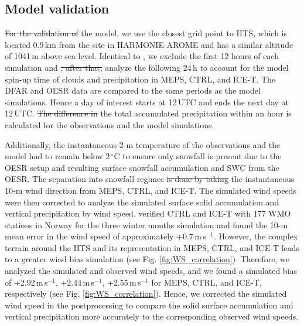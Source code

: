 \documentclass{ametsocV5}
\providecommand{\DIFadd}[1]{{\protect\color{blue}\uwave{#1}}} %
\providecommand{\DIFdel}[1]{{\protect\color{red}\sout{#1}}}                      %
\providecommand{\DIFaddbegin}{} %
\providecommand{\DIFaddend}{} %
\providecommand{\DIFdelbegin}{} %
\providecommand{\DIFdelend}{} %
\newcommand{\DIFscaledelfig}{0.5}
\newlength{\DIFdelgraphicswidth} %
\newlength{\DIFdelgraphicsheight} %
\newcommand{\DIFaddincludegraphics}[2][]{{\color{blue}\fbox{\DIFOincludegraphics[#1]{#2}}}} %
\newcommand{\DIFdelincludegraphics}[2][]{%
\sbox{\DIFdelgraphicsbox}{\DIFOincludegraphics[#1]{#2}}%
\settoboxwidth{\DIFdelgraphicswidth}{\DIFdelgraphicsbox} %
\settoboxtotalheight{\DIFdelgraphicsheight}{\DIFdelgraphicsbox} %
\scalebox{\DIFscaledelfig}{%
\parbox[b]{\DIFdelgraphicswidth}{\usebox{\DIFdelgraphicsbox}\\[-\baselineskip] \rule{\DIFdelgraphicswidth}{0em}}\llap{\resizebox{\DIFdelgraphicswidth}{\DIFdelgraphicsheight}{%
\setlength{\unitlength}{\DIFdelgraphicswidth}%
\begin{picture}(1,1)%
\thicklines\linethickness{2pt} %
{\color[rgb]{1,0,0}\put(0,0){\framebox(1,1){}}}%
{\color[rgb]{1,0,0}\put(0,0){\line( 1,1){1}}}%
{\color[rgb]{1,0,0}\put(0,1){\line(1,-1){1}}}%
\end{picture}%
}\hspace*{3pt}}} %
} %
\DeclareRobustCommand{\DIFaddbegin}{\DIFOaddbegin \let\includegraphics\DIFaddincludegraphics} %
\DeclareRobustCommand{\DIFaddend}{\DIFOaddend \let\includegraphics\DIFOincludegraphics} %
\DeclareRobustCommand{\DIFdelbegin}{\DIFOdelbegin \let\includegraphics\DIFdelincludegraphics} %
\DeclareRobustCommand{\DIFdelend}{\DIFOaddend \let\includegraphics\DIFOincludegraphics} %
\begin{document}
	\subsection{Model validation}\label{sec:methodology:MEPS_vali}
		\DIFdelbegin \DIFdel{For the validation of }\DIFdelend \DIFaddbegin \DIFadd{To validate }\DIFaddend the model, we use the closest grid point to HTS, which is located 0.9\,km from the site in HARMONIE-AROME and has a similar altitude of 1041\,m above sea level. Identical to \citet{engdahl_effects_2020}, we exclude the first 12 hours of each simulation and \DIFdelbegin \DIFdel{, after that, }\DIFdelend \DIFaddbegin \DIFadd{then }\DIFaddend analyze the following 24\,h to account for the model spin-up time of clouds and precipitation in MEPS, CTRL, and ICE-T. The DFAR and OESR data are compared to the same periods as the model simulations. Hence a day of interest starts at 12\,UTC and ends the next day at 12\,UTC. \DIFdelbegin \DIFdel{The difference in }\DIFdelend \DIFaddbegin \DIFadd{Finally, }\DIFaddend the total accumulated precipitation \DIFaddbegin \DIFadd{difference }\DIFaddend within an hour is calculated for the observations and the model simulations. 

		Additionally, the instantaneous 2-m temperature of the observations and the model had to remain below 2\,$^{\circ}$C to ensure only snowfall is present due to the OESR setup and resulting surface snowfall accumulation and SWC from the OESR. The separation into snowfall regimes \DIFdelbegin \DIFdel{is done by taking }\DIFdelend \DIFaddbegin \DIFadd{takes }\DIFaddend the instantaneous 10-m wind direction from MEPS, CTRL, and ICE-T. The simulated wind speeds were then corrected to analyze the simulated surface solid accumulation and vertical precipitation by wind speed. \citet{engdahl_effects_2020} verified CTRL and ICE-T with 177 WMO stations in Norway for the three winter months simulation and found the 10-m mean error in the wind speed of approximately +0.7\,m\,s$^{-1}$. However, the complex terrain around the HTS and its representation in MEPS, CTRL, and ICE-T leads to a greater wind bias simulation (see Fig. \ref{fig:WS_correlation}). Therefore, we analyzed the simulated and observed wind speeds, and we found a simulated bias of +2.92\,m\,s$^{-1}$, +2.44\,m\,s$^{-1}$, +2.55\,m\,s$^{-1}$ for MEPS, CTRL, and ICE-T, respectively (see Fig. \ref{fig:WS_correlation}). Hence, we corrected the simulated wind speed in the postprocessing to compare the solid surface accumulation and vertical precipitation more accurately to the corresponding observed wind speeds. 
\end{document}
